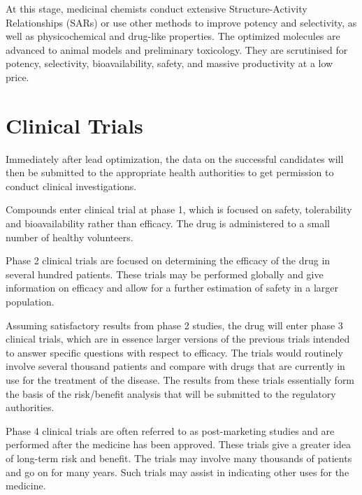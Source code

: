 At this stage, medicinal chemists conduct extensive Structure-Activity Relationships (SARs) \citep{328} or use other methods \citep{661,475} to improve potency and selectivity, as well as physicochemical and drug-like properties. The optimized molecules are advanced to animal models and preliminary toxicology. They are scrutinised for potency, selectivity, bioavailability, safety, and massive productivity at a low price.

\section{Clinical Trials}

Immediately after lead optimization, the data on the successful candidates will then be submitted to the appropriate health authorities to get permission to conduct clinical investigations.

Compounds enter clinical trial at phase 1, which is focused on safety, tolerability and bioavailability rather than efficacy. The drug is administered to a small number of healthy volunteers.

Phase 2 clinical trials are focused on determining the efficacy of the drug in several hundred patients. These trials may be performed globally and give information on efficacy and allow for a further estimation of safety in a larger population.

Assuming satisfactory results from phase 2 studies, the drug will enter phase 3 clinical trials, which are in essence larger versions of the previous trials intended to answer specific questions with respect to efficacy. The trials would routinely involve several thousand patients and compare with drugs that are currently in use for the treatment of the disease. The results from these trials essentially form the basis of the risk/benefit analysis that will be submitted to the regulatory authorities.

Phase 4 clinical trials are often referred to as post-marketing studies and are performed after the medicine has been approved. These trials give a greater idea of long-term risk and benefit. The trials may involve many thousands of patients and go on for many years. Such trials may assist in indicating other uses for the medicine.

\chapterend
